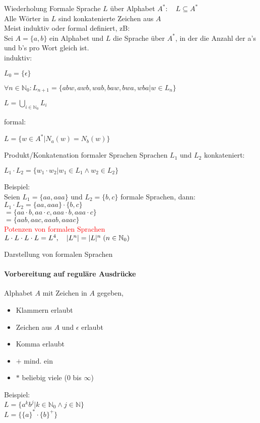 \begin{frame}{Wiederholung}
	Formale Sprache $L$ über Alphabet $A^{\ast}: \quad L\subseteq A^{\ast}$\\
	Alle Wörter in $L$ sind konkatenierte Zeichen aus $A$\\
	Meist induktiv oder formal definiert, zB:\\
	Sei $A=\{a,b\}$ ein Alphabet und $L$ die Sprache über $A^{\ast}$, in der die Anzahl der a's und b's pro Wort gleich ist.\\
	induktiv:
	\centerline{$L_{0}=\{\epsilon\}$}
	\centerline{$\forall n\in\mathbb{N}_{0}:L_{n+1}=\{abw,awb,wab,baw,bwa,wba\vert w\in L_{n}\}$}
	\centerline{$L=\bigcup\limits_{i\in\mathbb{N}_{0}}L_{i}$}
	formal:
	\centerline{$L=\{w\in A^{\ast}\vert N_{a}(w)=N_{b}(w)\}$}
\end{frame}

\begin{frame}{Produkt/Konkatenation formaler Sprachen}
	Sprachen $L_{1}$ und $L_{2}$ konkateniert:\\
	\centerline{$L_{1}\cdot L_{2}=\{w_{1}\cdot w_{2}\vert w_{1}\in L_{1}\wedge w_{2}\in L_{2}\}$}
	Beispiel:\\
	Seien $L_{1}=\{aa, aaa\}$ und $L_{2}=\{b,c\}$ formale Sprachen, dann:\\
	$L_{1}\cdot L_{2}=\{aa,aaa\}\cdot\{b,c\}$\\
	\hspace{11.5mm}$=\{aa\cdot b,aa\cdot c,aaa\cdot b,aaa\cdot c\}$\\
	\hspace{11.5mm}$=\{aab,aac,aaab,aaac\}$\\
	\textcolor{red}{Potenzen von formalen Sprachen}\\
	$L\cdot L\cdot L\cdot L=L^{4},\quad\lvert L^{n}\rvert=\lvert L\rvert^{n}\thickspace(n\in\mathbb{N}_{0})$\\
\end{frame}
\begin{frame}{Darstellung von formalen Sprachen}
	\framesubtitle{Vorbereitung auf reguläre Ausdrücke}
	Alphabet $A$ mit Zeichen in $A$ gegeben,\\
	\begin{itemize}
		\item Klammern erlaubt
		\item Zeichen aus $A$ und $\epsilon$ erlaubt
		\item Komma erlaubt
		\item $+$ mind. ein
		\item $\ast$ beliebig viele ($0$ bis $\infty$)
	\end{itemize}
	Beispiel:\\
	$L=\{a^{k}b^{j}\vert k\in\mathbb{N}_{0}\wedge j\in\mathbb{N}\}$\\
	$L=\{\{a\}^{\ast}\cdot\{b\}^{+}\}$\\
\end{frame}

\ifdefined\showSolutions
	
	
\else
	
\fi
